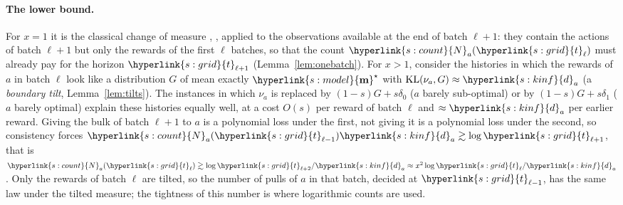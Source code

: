 \documentclass[10pt]{article}
\newcommand{\sy}[2]{{\hyperlink{#1}{#2}}}
\newcommand{\1}{\mathbf{1}}
\newcommand{\KL}{\mathrm{KL}}
\newcommand{\m}{\sy{s:model}{\mathbf{m}}}
\newcommand{\da}{\sy{s:kinf}{d}_a}
\newcommand{\Ng}{\sy{s:count}{N}}
\newcommand{\tl}{\sy{s:grid}{t}}
\begin{document}
\paragraph{The lower bound.} For $x=1$ it is the classical change of measure \citep{LR85}, \citep[(6)]{GMS19}, applied to the observations available at the
end of batch $\ell+1$: they contain the actions of batch $\ell+1$ but only the rewards of the first $\ell$ batches, so that the count $\Ng_a(\tl_\ell)$ must already pay for
the horizon $\tl_{\ell+1}$ (Lemma~\ref{lem:onebatch}). For $x>1$, consider the histories in which the rewards of $a$ in batch $\ell$ look like a distribution $G$ of mean
exactly $\m^\star$ with $\KL(\nu_a,G)\approx\da$ (a \emph{boundary tilt}, Lemma~\ref{lem:tilts}). The instances in which $\nu_a$ is replaced by $(1-s)G+s\delta_0$ ($a$ barely
sub-optimal) or by $(1-s)G+s\delta_1$ ($a$ barely optimal) explain these histories equally well, at a cost $O(s)$ per reward of batch $\ell$ and $\approx\da$ per earlier
reward. Giving the bulk of batch $\ell+1$ to $a$ is a polynomial loss under the first, not giving it is a polynomial loss under the second, so consistency forces
$\Ng_a(\tl_{\ell-1})\da\gtrsim\log\tl_{\ell+1}$, that is $\Ng_a(\tl_\ell)\gtrsim\log\tl_{\ell+2}/\da\approx x^2\log\tl_\ell/\da$. Only the rewards of batch $\ell$ are tilted, so the
number of pulls of $a$ in that batch, decided at $\tl_{\ell-1}$, has the same law under the tilted measure; the tightness of this number is where logarithmic counts are used.
\end{document}
